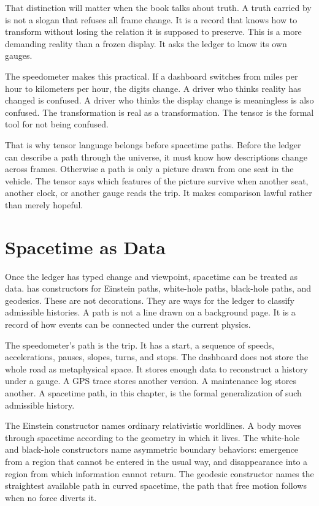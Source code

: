 That distinction will matter when the book talks about truth. A truth carried
by  is not a slogan that refuses all frame change. It is a
record that knows how to transform without losing the relation it is supposed
to preserve. This is a more demanding reality than a frozen display. It asks
the ledger to know its own gauges.

The speedometer makes this practical. If a dashboard switches from miles per
hour to kilometers per hour, the digits change. A driver who thinks reality has
changed is confused. A driver who thinks the display change is meaningless is
also confused. The transformation is real as a transformation. The tensor is
the formal tool for not being confused.

That is why tensor language belongs before spacetime paths. Before the ledger
can describe a path through the universe, it must know how descriptions change
across frames. Otherwise a path is only a picture drawn from one seat in the
vehicle. The tensor says which features of the picture survive when another
seat, another clock, or another gauge reads the trip.
It makes comparison lawful rather than merely hopeful.

\section{Spacetime as Data}
\label{se:spacetime-as-data}

Once the ledger has typed change and viewpoint, spacetime can be treated as
data.  has constructors for Einstein paths, white-hole
paths, black-hole paths, and geodesics. These are not decorations. They are
ways for the ledger to classify admissible histories. A path is not a line
drawn on a background page. It is a record of how events can be connected under
the current physics.

The speedometer's path is the trip. It has a start, a sequence of speeds,
accelerations, pauses, slopes, turns, and stops. The dashboard does not store
the whole road as metaphysical space. It stores enough data to reconstruct a
history under a gauge. A GPS trace stores another version. A maintenance log
stores another. A spacetime path, in this chapter, is the formal generalization
of such admissible history.

The Einstein constructor names ordinary relativistic worldlines. A body moves
through spacetime according to the geometry in which it lives. The white-hole
and black-hole constructors name asymmetric boundary behaviors: emergence from
a region that cannot be entered in the usual way, and disappearance into a
region from which information cannot return. The geodesic constructor names the
straightest available path in curved spacetime, the path that free motion
follows when no force diverts it.

